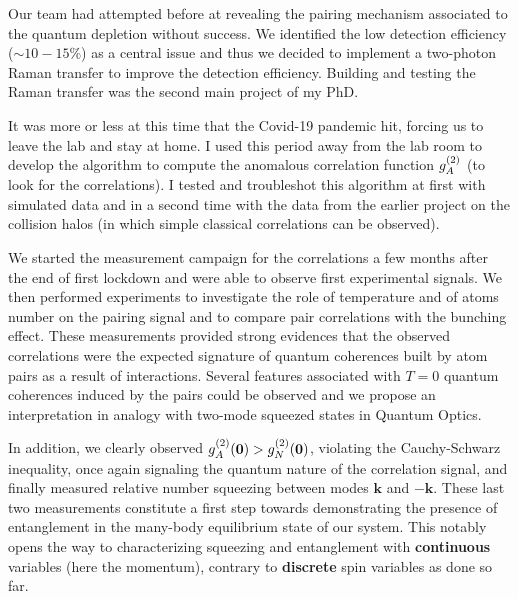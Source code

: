 Our team had attempted before at revealing the pairing mechanism associated to the quantum depletion without success. We identified the low detection efficiency ($\sim 10-15 \%$) as a central issue and thus we decided to implement a two-photon Raman transfer to improve the detection efficiency. Building and testing the Raman transfer was the second main project of my PhD. 

It was more or less at this time that the Covid-19 pandemic hit, forcing us to leave the lab and stay at home. I used this period away from the lab room to develop the algorithm to compute the anomalous correlation function $g^{(2)}_A$ (to look for the \kmk correlations). I tested and troubleshot this algorithm at first with simulated data and in a second time with the data from the earlier project on the collision halos (in which simple classical \kmk correlations can be observed). 

We started the measurement campaign for the \kmk correlations a few months after the end of first lockdown and were able to observe first experimental signals. We then performed experiments to investigate the role of temperature and of atoms number on the pairing signal and to compare pair correlations with the bunching effect. These measurements provided strong evidences that the observed \kmk correlations were the expected signature of quantum coherences built by atom pairs as a result of interactions. Several features associated with $T=0$ quantum coherences induced by the pairs could be observed and we propose an interpretation in analogy with two-mode squeezed states in Quantum Optics. 

In addition, we clearly observed $g^{(2)}_A (\bm{0}) > g^{(2)}_N (\bm{0})$, violating the Cauchy-Schwarz inequality, once again signaling the quantum nature of the correlation signal, and finally measured relative number squeezing between modes $\bm{k}$ and $-\bm{k}$. These last two measurements constitute a first step towards demonstrating the presence of entanglement in the many-body equilibrium state of our system. This notably opens the way to characterizing squeezing and entanglement with \textbf{continuous} variables (here the momentum), contrary to \textbf{discrete} spin variables as done so far.

